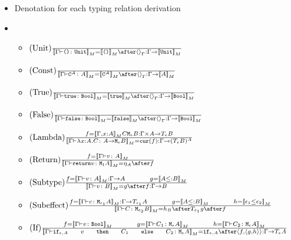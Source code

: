 \documentclass{report}
\begin{document}
\begin{itemize}
    \item Denotation for each typing relation derivation
    \item \begin{itemize}
        \item $\treerule{Unit}{}{\deno{\typerelation{\G}{\u}{\U}} = \deno{\u} \after \term{\G} : \G \rightarrow \deno{\U}}$
        
        \item $\treerule{Const}{}{\deno{\typerelation{\G}{\const{A}}{A}} = \deno{\const{A}} \after \term{\G} : \G \rightarrow \deno{A}}$
         
        \item $\treerule{True}{}{\deno{\typerelation{\G}{\t}{\B}} = \deno{\t} \after \term{\G} : \G \rightarrow \deno{\B}}$
        
        \item $\treerule{False}{}{\deno{\typerelation{\G}{\f}{\B}} = \deno{\f} \after \term{\G} : \G \rightarrow \deno{\B}}$
        
        \item $(\text{Lambda}) \frac{f = {\bf [\![}\Gamma, x: A{\bf ]\!]}_M{C}{\texttt{M}_{\epsilon}{B}} : \Gamma \times A \rightarrow T_{\epsilon}{B}}{{\bf [\![}\Gamma \vdash \lambda x : A. C \colon A \rightarrow \texttt{M}_{\epsilon}{B}{\bf ]\!]}_M = \texttt{cur}(f) : \Gamma \rightarrow (T_{\epsilon}{B})^A}$
        
        \item $\treerule{Return}{f = \deno{\typerelation{\G}{v}{A}}}{\deno{\typerelation{\G}{\return{v}}{\M{\1}{A}}} = \point{A} \after f}$
        
        \item $\treerule{Subtype}{f = \deno{\typerelation{\G}{v}{A}} : \G \rightarrow A\s\s g = \deno{A \subtype B}}{\deno{\typerelation{\G}{v}{B}} = g \after f : \G \rightarrow B}$
        \item $\treerule{Subeffect}{f = \deno{\typerelation{\G}{c}{\M{\e_1}{A}}}: \G \rightarrow \T{\e_1}{A} \s\s g = \deno{A \subtype B}\s\s h = \deno{\e_1 \subeffect{ \e_2}}}{\deno{\typerelation{\G}{C}{\M{\e_2}{B}}} = h_B \after \T{\e_1}{g} \after f}$
        
        \item $\treerule{If}{f = \deno{\typerelation{\G}{v}{\B}}\s\s g = \deno{\typerelation{\G}{C_1}{\M{\e}{A}}}\s\s h = \deno{\typerelation{\G}{C_2}{\M{\e}{A}}}}{\deno{{\typerelation{\G}{\ifthenelse{\e}{A}{v}{C_1}{C_2}}{\M{\e}{A}}}} = \ifd{\e}{A} \after \pr{f}{\pr{g}{h}} : \G \rightarrow \T{\e}{A}}$
        

\end{itemize}
\end{itemize}
\end{document}

